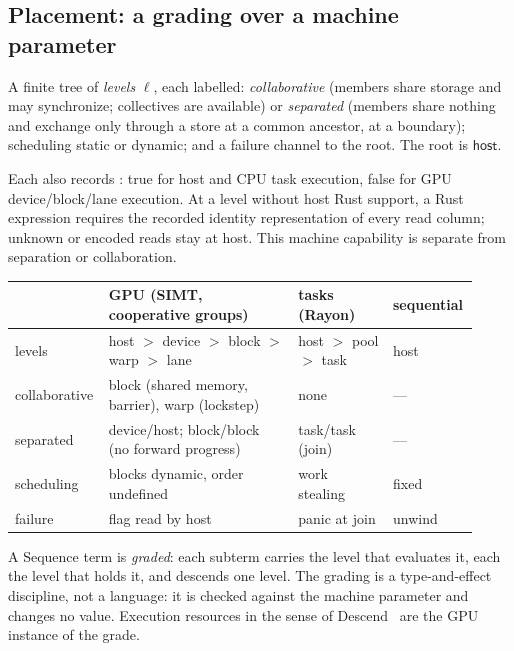 \subsection{Placement: a grading over a machine parameter}
\begin{definition}
A finite tree of \emph{levels} $\ell$, each labelled: \emph{collaborative}
(members share storage and may synchronize; collectives are available) or
\emph{separated} (members share nothing and exchange only through a store
at a common ancestor, at a boundary); scheduling static or dynamic; and a
failure channel to the root. The root is $\mathsf{host}$.
\end{definition}
Each  also records : true for host and
CPU task execution, false for GPU device/block/lane execution. At a level
without host Rust support, a Rust expression requires the recorded identity
representation of every read column; unknown or encoded reads stay at host.
This machine capability is separate from separation or collaboration.
\begin{center}
\begin{tabular}{@{}p{0.16\linewidth}p{0.4\linewidth}p{0.2\linewidth}p{0.16\linewidth}@{}}
\toprule
 & GPU (SIMT, cooperative groups) & tasks (Rayon) & sequential\\
\midrule
levels & host $>$ device $>$ block $>$ warp $>$ lane & host $>$ pool $>$ task & host\\
collaborative & block (shared memory, barrier), warp (lockstep) & none & —\\
separated & device/host; block/block (no forward progress) & task/task (join) & —\\
scheduling & blocks dynamic, order undefined & work stealing & fixed\\
failure & flag read by host & panic at join & unwind\\
\bottomrule
\end{tabular}
\end{center}
A Sequence term is \emph{graded}: each subterm carries the level that
evaluates it, each  the level that holds it, and 
descends one level. The grading is a type-and-effect discipline, not a
language: it is checked against the machine parameter and changes no value.
Execution resources in the sense of Descend~\cite{paper-descend} are the
GPU instance of the grade.
